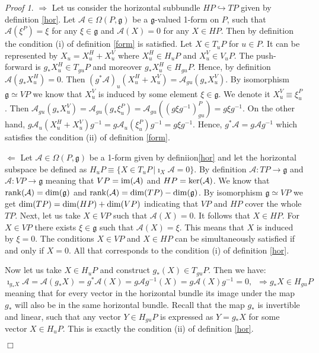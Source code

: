 \documentclass[11pt]{report}
\theoremstyle{plain}
\theoremstyle{definition}
\theoremstyle{remark}
\theoremstyle{remark}
\newtheorem*{pr}{Proof}
\numberwithin{equation}{section}
\begin{document}
\begin{pr}

$\Longrightarrow$ Let us consider the horizontal subbundle $HP \hookrightarrow TP$ given by definition \ref{hor}. 
Let $\mathcal{A} \in \Omega(P, \mathfrak{g})$ be a $\mathfrak{g}$-valued 1-form on $P$, such that $\mathcal{A} (\xi^P) = \xi$ for any 
$\xi \in \mathfrak{g}$ and  $\mathcal{A} (X) = 0$ for any $X \in HP$. Then by definition the condition (i) of definition \ref{form} is satisfied. 
Let $X\in T_uP$ for $u\in P$. It can be represented by $X_u =X^H_u + X^V_u$ where $X^H_u \in H_uP$ and $X^V_u \in V_uP$. 
The push-forward is $g_*X^H_u \in T_{gu}P$ and moreover $g_*X^H_u \in H_{gu}P$. Hence, by definition $\mathcal{A}(g_*X^H_u)= 0$.
Then $(g^*\mathcal{A})_u(X^H_u + X^V_u) = \mathcal{A}_{gu}(g_*X^V_u)$. By isomorphism $\mathfrak{g} \simeq VP$ we know that $X^V_u$ is induced by some element $\xi \in \mathfrak{g}$. We denote it $X^V_u \equiv \xi^P_u$. Then $\mathcal{A}_{gu}(g_*X^V_u) =\mathcal{A}_{gu}(g_*\xi^P_u) = \mathcal{A}_{gu}\left( (g\xi g^{-1})^P_{gu}\right) = g\xi g^{-1}$. On the other hand, $g\mathcal{A}_u(X^H_u + X^V_u)g^{-1} = g\mathcal{A}_u(\xi^P_u)g^{-1} = g\xi g^{-1}$. Hence, $g^*\mathcal{A} = g\mathcal{A}g^{-1}$ which satisfies the condition (ii) of definition \ref{form}.



$\Longleftarrow$ 
Let $\mathcal{A} \in \Omega(P, \mathfrak{g})$ be a 1-form given by definiion\ref{hor} and let the horizontal subspace be defined as $H_uP \equiv \{X \in T_uP \, | \imath_X \mathcal{A} = 0\}$. By definition $\mathcal{A}: TP \to \mathfrak{g}$ and $\mathcal{A}: VP \to \mathfrak{g}$ meaning that $VP = {\rm im}(\mathcal{A})$ and $HP = {\rm ker}(\mathcal{A})$. We know that ${\rm rank}(\mathcal{A}) = {\rm dim} (\mathfrak{g})$ and ${\rm rank}(\mathcal{A}) = {\rm dim} (TP) - {\rm dim} (\mathfrak{g})$. By isomorphism $\mathfrak{g} \simeq VP$ we get ${\rm dim} (TP) = {\rm dim} (HP) + {\rm dim} (VP)$ indicating that $VP$ and $HP$ cover the whole $TP$. Next, let us take $X \in VP$ such that $\mathcal{A}(X) = 0$. It follows that $X\in HP$. For $X \in VP$  there exists $\xi \in \mathfrak{g}$ such that $\mathcal{A}(X) = \xi$. This means that $X$ is induced by $\xi = 0$. The conditions $X \in VP$ and $X\in HP$ can be simultaneously satisfied if and only if $X = 0$. All that corresponds to the condition (i) of definition \ref{hor}. 

Now let us take $X\in H_uP$ and construct $g_*(X)\in T_{gu}P$. Then we have:
$$
\imath_{g_*X}\mathcal{A} = \mathcal{A}(g_*X) = g^*\mathcal{A}(X) = g \mathcal{A} g^{-1} (X) = g \mathcal{A} (X) g^{-1}= 0, \, \, \, \Longrightarrow g_*X\in H_{gu}P
$$
meaning that for every vector in the horizontal bundle its image under the map $g_*$ will also be in the same horizontal bundle. Recall that the map $g_*$ is invertible and linear, such that any vector $Y\in H_{gu}P$ is expressed as $Y= g_*X$ for some vector $X\in H_uP$. This is exactly the condition (ii) of definition \ref{hor}.

$\Box$
\end{pr}
\end{document}
